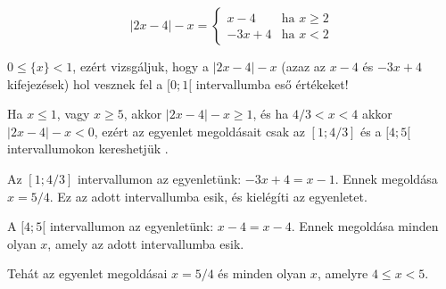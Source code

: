 \documentclass[a4paper,10pt]{article}
\begin{document}
$$|2x-4|-x =
\left\{
\begin{array}{rl}
		x-4  & \mbox{ha } x \geq 2 \\
		-3x+4 & \mbox{ha } x < 2
	\end{array}
\right. $$

$0\le \{x\}<1$, ezért vizsgáljuk, hogy a $|2x-4|-x$
(azaz az $x-4$ és $-3x+4$ kifejezések) hol vesznek fel a $[0; 1[$ intervallumba eső értékeket!

Ha $x \le 1$, vagy $x\ge 5$, akkor 
$|2x-4|-x \ge 1$,
és ha $4/3 <x< 4$ akkor $|2x-4|-x <0$,
ezért az egyenlet megoldásait csak az $[1; 4/3]$ és a $[4; 5[$ intervallumokon kereshetjük .

Az $[1 ; 4/3]$ intervallumon az egyenletünk: $-3x+4 = x-1$. Ennek megoldása $x=5/4$. Ez az
adott intervallumba esik, és kielégíti az egyenletet. 

A $[4; 5[$ intervallumon az egyenletünk: $x-4 = x-4$. Ennek megoldása minden olyan $x$, amely
az adott intervallumba esik.

Tehát az egyenlet megoldásai $x=5/4$ és minden olyan $x$, amelyre $4\le x<5$.
\end{document}
